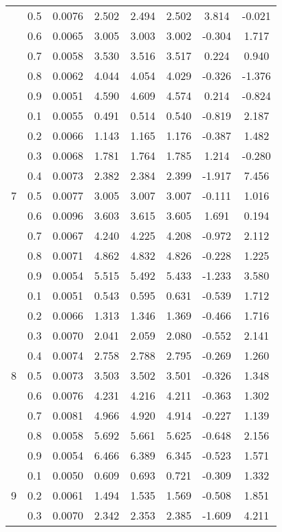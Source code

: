 \documentclass[11pt,a4paper]{report}
\begin{document}
\begin{longtable}{ | c | c || c | c | c | c | c | c | }
 & 0.5 & 0.0076 & 2.502 & 2.494 & 2.502 & 3.814 & -0.021 \\
 & 0.6 & 0.0065 & 3.005 & 3.003 & 3.002 & -0.304 & 1.717 \\
 & 0.7 & 0.0058 & 3.530 & 3.516 & 3.517 & 0.224 & 0.940 \\
 & 0.8 & 0.0062 & 4.044 & 4.054 & 4.029 & -0.326 & -1.376 \\
 & 0.9 & 0.0051 & 4.590 & 4.609 & 4.574 & 0.214 & -0.824 \\
 \hline
\multirow{9}{*}{7} & 0.1 & 0.0055 & 0.491 & 0.514 & 0.540 & -0.819 & 2.187 \\
 & 0.2 & 0.0066 & 1.143 & 1.165 & 1.176 & -0.387 & 1.482 \\
 & 0.3 & 0.0068 & 1.781 & 1.764 & 1.785 & 1.214 & -0.280 \\
 & 0.4 & 0.0073 & 2.382 & 2.384 & 2.399 & -1.917 & 7.456 \\
 & 0.5 & 0.0077 & 3.005 & 3.007 & 3.007 & -0.111 & 1.016 \\
 & 0.6 & 0.0096 & 3.603 & 3.615 & 3.605 & 1.691 & 0.194 \\
 & 0.7 & 0.0067 & 4.240 & 4.225 & 4.208 & -0.972 & 2.112 \\
 & 0.8 & 0.0071 & 4.862 & 4.832 & 4.826 & -0.228 & 1.225 \\
 & 0.9 & 0.0054 & 5.515 & 5.492 & 5.433 & -1.233 & 3.580 \\
 \hline
\multirow{9}{*}{8} & 0.1 & 0.0051 & 0.543 & 0.595 & 0.631 & -0.539 & 1.712 \\
 & 0.2 & 0.0066 & 1.313 & 1.346 & 1.369 & -0.466 & 1.716 \\
 & 0.3 & 0.0070 & 2.041 & 2.059 & 2.080 & -0.552 & 2.141 \\
 & 0.4 & 0.0074 & 2.758 & 2.788 & 2.795 & -0.269 & 1.260 \\
 & 0.5 & 0.0073 & 3.503 & 3.502 & 3.501 & -0.326 & 1.348 \\
 & 0.6 & 0.0076 & 4.231 & 4.216 & 4.211 & -0.363 & 1.302 \\
 & 0.7 & 0.0081 & 4.966 & 4.920 & 4.914 & -0.227 & 1.139 \\
 & 0.8 & 0.0058 & 5.692 & 5.661 & 5.625 & -0.648 & 2.156 \\
 & 0.9 & 0.0054 & 6.466 & 6.389 & 6.345 & -0.523 & 1.571 \\
 \hline
\multirow{9}{*}{9} & 0.1 & 0.0050 & 0.609 & 0.693 & 0.721 & -0.309 & 1.332 \\
 & 0.2 & 0.0061 & 1.494 & 1.535 & 1.569 & -0.508 & 1.851 \\
 & 0.3 & 0.0070 & 2.342 & 2.353 & 2.385 & -1.609 & 4.211 \\

\end{longtable}
\end{document}
